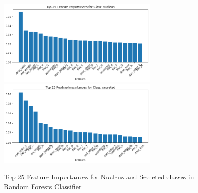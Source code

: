 \documentclass{bioinfo}
\begin{document}




\begin{figure}[t]
\includegraphics[width=8cm]{nucleus_import}
\centering
\includegraphics[width=8cm]{secreted_import}
\caption{Top 25 Feature Importances for Nucleus and Secreted classes in Random Forests Classifier}
\label{fig:import2}
\centering
\end{figure}
\end{document}
